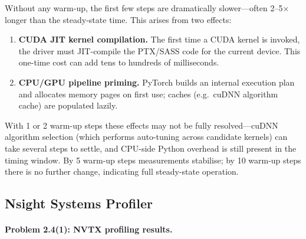 \documentclass[11pt]{article}
\begin{document}
Without any warm-up, the first few steps are dramatically slower---often 2--5$\times$
longer than the steady-state time. This arises from two effects:
\begin{enumerate}
  \item \textbf{CUDA JIT kernel compilation.} The first time a CUDA kernel is invoked,
        the driver must JIT-compile the PTX/SASS code for the current device. This
        one-time cost can add tens to hundreds of milliseconds.
  \item \textbf{CPU/GPU pipeline priming.} PyTorch builds an internal execution plan
        and allocates memory pages on first use; caches (e.g.\ cuDNN algorithm cache)
        are populated lazily.
\end{enumerate}
With 1 or 2 warm-up steps these effects may not be fully resolved---cuDNN algorithm
selection (which performs auto-tuning across candidate kernels) can take several steps
to settle, and CPU-side Python overhead is still present in the timing window.
By 5 warm-up steps measurements stabilise; by 10 warm-up steps there is no further
change, indicating full steady-state operation.

\subsection{Nsight Systems Profiler}

\paragraph{Problem 2.4(1): NVTX profiling results.}
\end{document}
